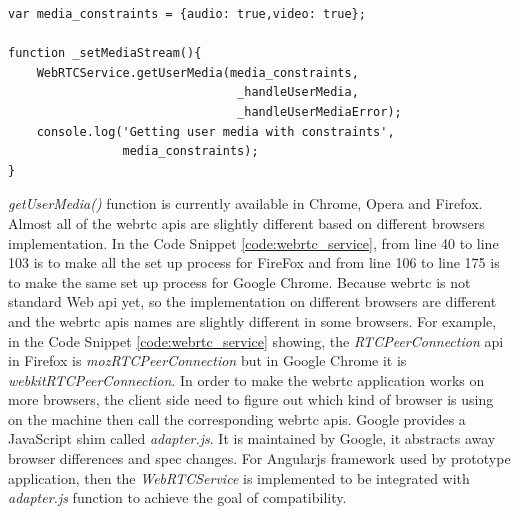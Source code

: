 \begin{lstlisting}[caption={Get User Media Stream function},label={code:get_user_media}]
var media_constraints = {audio: true,video: true};

function _setMediaStream(){
	WebRTCService.getUserMedia(media_constraints,
  								_handleUserMedia,
  								_handleUserMediaError);
  	console.log('Getting user media with constraints', 
  				media_constraints);
}
\end{lstlisting}

\par \textit{getUserMedia()} function is currently available in Chrome, Opera and Firefox. Almost all of the \gls{webrtc} \gls{api}s are slightly different based on different browsers implementation. In the Code Snippet \ref{code:webrtc_service}, from line 40 to line 103 is to make all the set up process for FireFox and from line 106 to line 175 is to make the same set up process for Google Chrome. Because \gls{webrtc} is not standard Web \gls{api} yet, so the implementation on different browsers are different and the \gls{webrtc} \gls{api}s names are slightly different in some browsers. For example, in the Code Snippet \ref{code:webrtc_service} showing, the \textit{RTCPeerConnection} \gls{api} in Firefox is \textit{mozRTCPeerConnection} but in Google Chrome it is \textit{webkitRTCPeerConnection}. In order to make the \gls{webrtc} application works on more browsers, the client side need to figure out which kind of browser is using on the machine then call the corresponding \gls{webrtc} \gls{api}s. Google provides a JavaScript shim called \textit{adapter.js}. It is maintained by Google, it abstracts away browser differences and spec changes. For Angularjs framework used by prototype application, then the \textit{WebRTCService} is implemented to be integrated with \textit{adapter.js} function to achieve the goal of compatibility.

